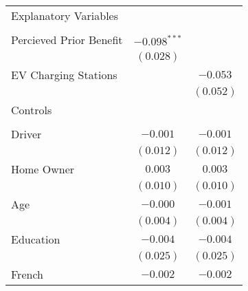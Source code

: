 \begin{center}
\begin{tiny}
\begin{longtable}{l@{} c@{} c@{}}
Explanatory Variables                                                       &                 &                  \\
                                                                            &                 &                  \\
\quad Percieved Prior Benefit                                               & $-0.098^{***}$  &                  \\
                                                                            & $(0.028)$       &                  \\
\quad EV Charging Stations                                                  &                 & $-0.053$         \\
                                                                            &                 & $(0.052)$        \\
Controls                                                                    &                 &                  \\
                                                                            &                 &                  \\
\quad Driver                                                                & $-0.001$        & $-0.001$         \\
                                                                            & $(0.012)$       & $(0.012)$        \\
\quad Home Owner                                                            & $0.003$         & $0.003$          \\
                                                                            & $(0.010)$       & $(0.010)$        \\
\quad Age                                                                   & $-0.000$        & $-0.001$         \\
                                                                            & $(0.004)$       & $(0.004)$        \\
\quad Education                                                             & $-0.004$        & $-0.004$         \\
                                                                            & $(0.025)$       & $(0.025)$        \\
\quad French                                                                & $-0.002$        & $-0.002$         \\

\end{longtable}
\end{tiny}
\end{center}
